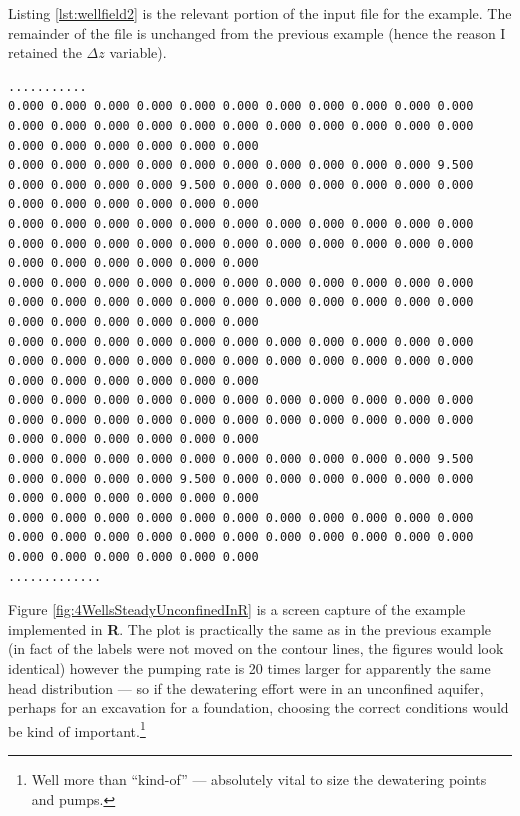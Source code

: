 Listing \ref{lst:wellfield2} is the relevant portion of the input file for the example.  The remainder of the file is unchanged from the previous example (hence the reason I retained the $\Delta z$ variable).
\begin{lstlisting}[caption= Relevant portion of input file for unconfined flow example.  Only the pumping values are different. , label=lst:wellfield2]
...........
0.000 0.000 0.000 0.000 0.000 0.000 0.000 0.000 0.000 0.000 0.000 0.000 0.000 0.000 0.000 0.000 0.000 0.000 0.000 0.000 0.000 0.000 0.000 0.000 0.000 0.000 0.000 0.000
0.000 0.000 0.000 0.000 0.000 0.000 0.000 0.000 0.000 0.000 9.500 0.000 0.000 0.000 0.000 9.500 0.000 0.000 0.000 0.000 0.000 0.000 0.000 0.000 0.000 0.000 0.000 0.000
0.000 0.000 0.000 0.000 0.000 0.000 0.000 0.000 0.000 0.000 0.000 0.000 0.000 0.000 0.000 0.000 0.000 0.000 0.000 0.000 0.000 0.000 0.000 0.000 0.000 0.000 0.000 0.000
0.000 0.000 0.000 0.000 0.000 0.000 0.000 0.000 0.000 0.000 0.000 0.000 0.000 0.000 0.000 0.000 0.000 0.000 0.000 0.000 0.000 0.000 0.000 0.000 0.000 0.000 0.000 0.000
0.000 0.000 0.000 0.000 0.000 0.000 0.000 0.000 0.000 0.000 0.000 0.000 0.000 0.000 0.000 0.000 0.000 0.000 0.000 0.000 0.000 0.000 0.000 0.000 0.000 0.000 0.000 0.000
0.000 0.000 0.000 0.000 0.000 0.000 0.000 0.000 0.000 0.000 0.000 0.000 0.000 0.000 0.000 0.000 0.000 0.000 0.000 0.000 0.000 0.000 0.000 0.000 0.000 0.000 0.000 0.000
0.000 0.000 0.000 0.000 0.000 0.000 0.000 0.000 0.000 0.000 9.500 0.000 0.000 0.000 0.000 9.500 0.000 0.000 0.000 0.000 0.000 0.000 0.000 0.000 0.000 0.000 0.000 0.000
0.000 0.000 0.000 0.000 0.000 0.000 0.000 0.000 0.000 0.000 0.000 0.000 0.000 0.000 0.000 0.000 0.000 0.000 0.000 0.000 0.000 0.000 0.000 0.000 0.000 0.000 0.000 0.000
.............
\end{lstlisting}

Figure \ref{fig:4WellsSteadyUnconfinedInR} is a screen capture of the example implemented in \textbf{R}.
The plot is practically the same as in the previous example (in fact of the labels were not moved on the contour lines, the figures would look identical) however the pumping rate is 20 times larger for apparently the same head distribution --- so if the dewatering effort were in an unconfined aquifer, perhaps for an excavation for a foundation, choosing the correct conditions would be kind of important.\footnote{Well more than ``kind-of''  --- absolutely vital to size the dewatering points and pumps.}

